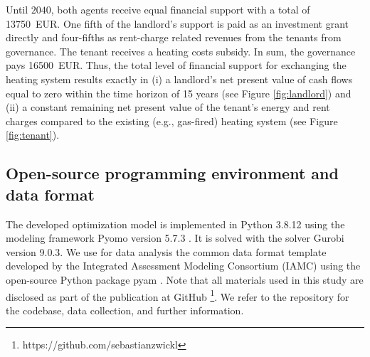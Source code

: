 Until $2040$, both agents receive equal financial support with a total of \SI{13750}{EUR}. One fifth of the landlord's support is paid as an investment grant directly and four-fifths as rent-charge related revenues from the tenants from governance. The tenant receives a heating costs subsidy. In sum, the governance pays \SI{16500}{EUR}. Thus, the total level of financial support for exchanging the heating system results exactly in (i) a landlord's net present value of cash flows equal to zero within the time horizon of 15 years (see Figure \ref{fig:landlord}) and (ii) a constant remaining net present value of the tenant's energy and rent charges compared to the existing (e.g., gas-fired) heating system (see Figure \ref{fig:tenant}). 

\subsection{Open-source programming environment and data format}\label{met:os}
The developed optimization model is implemented in Python 3.8.12 using the modeling framework Pyomo version 5.7.3 \cite{hart2017optimization}. It is solved with the solver Gurobi version 9.0.3. We use for data analysis the common data format template developed by the Integrated Assessment Modeling Consortium (IAMC) using the open-source Python package pyam \cite{huppmann2021pyam}. Note that all materials used in this study are disclosed as part of the publication at GitHub \footnote{https://github.com/sebastianzwickl}. We refer to the repository for the codebase, data collection, and further information. 